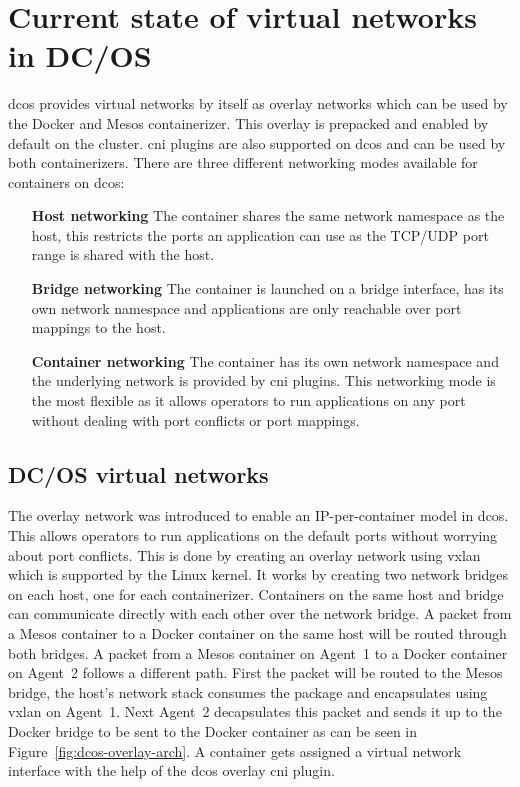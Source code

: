 \section{Current state of virtual networks in DC/OS}
\label{sec:current-state}
\Gls{dcos} provides virtual networks by itself as overlay networks which can be used by the Docker and Mesos containerizer. This overlay is prepacked and enabled by default on the cluster. \Gls{cni} plugins are also supported on \gls{dcos} and can be used by both containerizers. There are three different networking modes available for containers on \gls{dcos}:
\begin{itemize}
    \item[\textbf{Host networking}] The container shares the same network namespace as the host, this restricts the ports an application can use as the TCP/UDP port range is shared with the host.
    \item[\textbf{Bridge networking}] The container is launched on a bridge interface, has its own network namespace and applications are only reachable over port mappings to the host.
    \item[\textbf{Container networking}]  The container has its own network namespace and the underlying network is provided by \gls{cni} plugins. This networking mode is the most flexible as it allows operators to run applications on any port without dealing with port conflicts or port mappings.
\end{itemize}

\subsection{DC/OS virtual networks}
\label{subsec:dcos-virtual-networks}
The overlay network was introduced to enable an IP-per-container model in \gls{dcos}. This allows operators to run applications on the default ports without worrying about port conflicts. This is done by creating an overlay network using \gls{vxlan}\cite{mahalingam2014virtual} which is supported by the Linux kernel. It works by creating two network bridges on each host, one for each containerizer. Containers on the same host and bridge can communicate directly with each other over the network bridge. A packet from a Mesos container to a Docker container on the same host will be routed through both bridges. A packet from a Mesos container on Agent~1 to a Docker container on Agent~2 follows a different path. First the packet will be routed to the Mesos bridge, the host's network stack consumes the package and encapsulates using \gls{vxlan} on Agent~1. Next Agent~2 decapsulates this packet and sends it up to the Docker bridge to be sent to the Docker container as can be seen in Figure~\ref{fig:dcos-overlay-arch}. A container gets assigned a virtual network interface with the help of the \gls{dcos} overlay \gls{cni} plugin.

